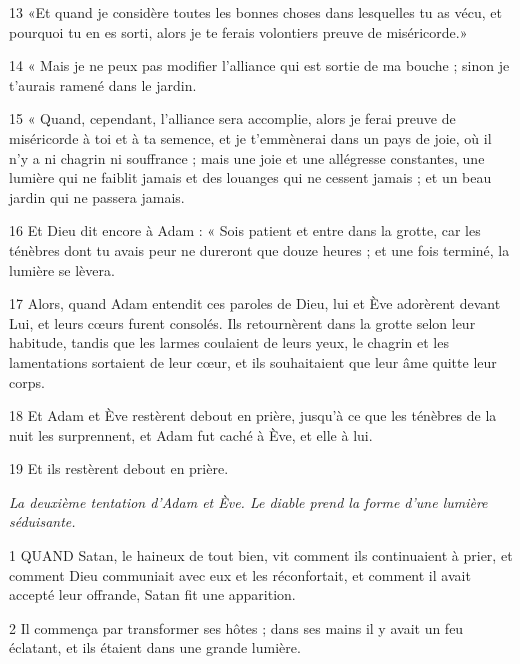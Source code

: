 \par 13 «Et quand je considère toutes les bonnes choses dans lesquelles tu as vécu, et pourquoi tu en es sorti, alors je te ferais volontiers preuve de miséricorde.»

\par 14 « Mais je ne peux pas modifier l'alliance qui est sortie de ma bouche ; sinon je t'aurais ramené dans le jardin.

\par 15 « Quand, cependant, l'alliance sera accomplie, alors je ferai preuve de miséricorde à toi et à ta semence, et je t'emmènerai dans un pays de joie, où il n'y a ni chagrin ni souffrance ; mais une joie et une allégresse constantes, une lumière qui ne faiblit jamais et des louanges qui ne cessent jamais ; et un beau jardin qui ne passera jamais.

\par 16 Et Dieu dit encore à Adam : « Sois patient et entre dans la grotte, car les ténèbres dont tu avais peur ne dureront que douze heures ; et une fois terminé, la lumière se lèvera.

\par 17 Alors, quand Adam entendit ces paroles de Dieu, lui et Ève adorèrent devant Lui, et leurs cœurs furent consolés. Ils retournèrent dans la grotte selon leur habitude, tandis que les larmes coulaient de leurs yeux, le chagrin et les lamentations sortaient de leur cœur, et ils souhaitaient que leur âme quitte leur corps.

\par 18 Et Adam et Ève restèrent debout en prière, jusqu'à ce que les ténèbres de la nuit les surprennent, et Adam fut caché à Ève, et elle à lui.

\par 19 Et ils restèrent debout en prière.


\par \textit{La deuxième tentation d'Adam et Ève. Le diable prend la forme d'une lumière séduisante.}

\par 1 QUAND Satan, le haineux de tout bien, vit comment ils continuaient à prier, et comment Dieu communiait avec eux et les réconfortait, et comment il avait accepté leur offrande, Satan fit une apparition.

\par 2 Il commença par transformer ses hôtes ; dans ses mains il y avait un feu éclatant, et ils étaient dans une grande lumière.


